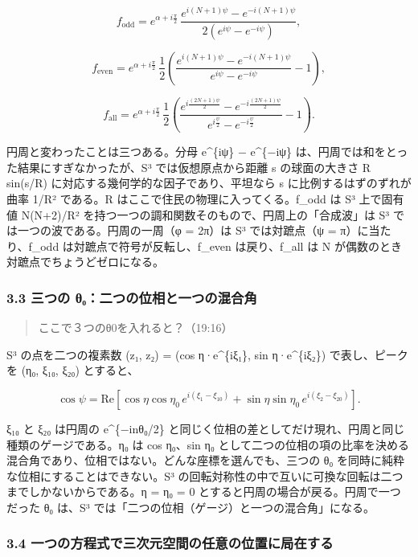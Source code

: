 \documentclass[
  a4paper,
]{ltjsarticle}
\begin{document}
\[
f_{\mathrm{odd}}=e^{\alpha+i\frac{\pi}{2}}\,\frac{e^{i(N+1)\psi}-e^{-i(N+1)\psi}}{2\left(e^{i\psi}-e^{-i\psi}\right)},
\]

\[
f_{\mathrm{even}}=e^{\alpha+i\frac{\pi}{2}}\,\frac{1}{2}\left(\frac{e^{i(N+1)\psi}-e^{-i(N+1)\psi}}{e^{i\psi}-e^{-i\psi}}-1\right),
\]

\[
f_{\mathrm{all}}=e^{\alpha+i\frac{\pi}{2}}\,\frac{1}{2}\left(\frac{e^{i\frac{(2N+1)\psi}{2}}-e^{-i\frac{(2N+1)\psi}{2}}}{e^{i\frac{\psi}{2}}-e^{-i\frac{\psi}{2}}}-1\right).
\]

円周と変わったことは三つある。分母 e\^{}\{iψ\} − e\^{}\{−iψ\}
は、円周では和をとった結果にすぎなかったが、S³ では仮想原点から距離 s
の球面の大きさ R sin(s/R) に対応する幾何学的な因子であり、平坦なら s
に比例するはずのずれが曲率 1/R² である。R
はここで住民の物理に入ってくる。f\_odd は S³ 上で固有値 N(N+2)/R²
を持つ一つの調和関数そのもので、円周上の「合成波」は S³
では一つの波である。円周の一周（φ = 2π）は S³ では対蹠点（ψ =
π）に当たり、f\_odd は対蹠点で符号が反転し、f\_even は戻り、f\_all は N
が偶数のとき対蹠点でちょうどゼロになる。

\subsubsection{3.3 三つの
θ₀：二つの位相と一つの混合角}\label{ux4e09ux3064ux306e-ux3b8ux2080ux4e8cux3064ux306eux4f4dux76f8ux3068ux4e00ux3064ux306eux6df7ux5408ux89d2}

\begin{quote}
ここで３つのθ0を入れると？（19:16）
\end{quote}

S³ の点を二つの複素数 (z₁, z₂) = (cos η·e\^{}\{iξ₁\}, sin
η·e\^{}\{iξ₂\}) で表し、ピークを (η₀, ξ₁₀, ξ₂₀) とすると、

\[
\cos\psi=\mathrm{Re}\left[\cos\eta\cos\eta_0\,e^{i(\xi_1-\xi_{10})}+\sin\eta\sin\eta_0\,e^{i(\xi_2-\xi_{20})}\right].
\]

ξ₁₀ と ξ₂₀ は円周の e\^{}\{−inθ₀/2\}
と同じく位相の差としてだけ現れ、円周と同じ種類のゲージである。η₀ は cos
η₀、sin η₀
として二つの位相の項の比率を決める混合角であり、位相ではない。どんな座標を選んでも、三つの
θ₀ を同時に純粋な位相にすることはできない。S³
の回転対称性の中で互いに可換な回転は二つまでしかないからである。η = η₀ =
0 とすると円周の場合が戻る。円周で一つだった θ₀ は、S³
では「二つの位相（ゲージ）と一つの混合角」になる。

\subsubsection{3.4
一つの方程式で三次元空間の任意の位置に局在する}\label{ux4e00ux3064ux306eux65b9ux7a0bux5f0fux3067ux4e09ux6b21ux5143ux7a7aux9593ux306eux4efbux610fux306eux4f4dux7f6eux306bux5c40ux5728ux3059ux308b}
\end{document}
